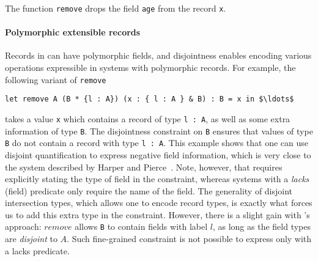 \noindent The function \lstinline{remove} drops the field
\lstinline{age} from the record \lstinline{x}. 

\paragraph{Polymorphic extensible records} Records in \name can have
polymorphic fields, and disjointness enables encoding various
operations expressible in systems with polymorphic records. For example, 
the following variant of \lstinline{remove}

\begin{lstlisting}[mathescape=true]
let remove A (B * {l : A}) (x : { l : A } & B) : B = x in $\ldots$ 
\end{lstlisting}

\noindent takes a value \lstinline{x} which contains a record of type
\lstinline{l : A}, as well as some extra information of type
\lstinline{B}. The disjointness constraint on \lstinline{B} ensures
that values of type \lstinline{B} do not contain a record with type
\lstinline{l : A}.  This example shows that one
can use disjoint quantification to express negative field information,
which is very close to the system described by Harper and
Pierce~\cite{harper1991record}.  Note, however, that \name requires
explicitly stating the type of field in the constraint, whereas
systems with a \emph{lacks} (field) predicate only require the name of the field.
The generality of disjoint intersection types, which allows one to
encode record types, is exactly what forces us to add this extra type
in the constraint.  However, there is a slight gain with \name's
approach: $remove$ allows \lstinline{B} to contain fields with label $l$, as long as
the field types are \emph{disjoint} to $A$. Such fine-grained
constraint is not possible to express only with a lacks predicate.

